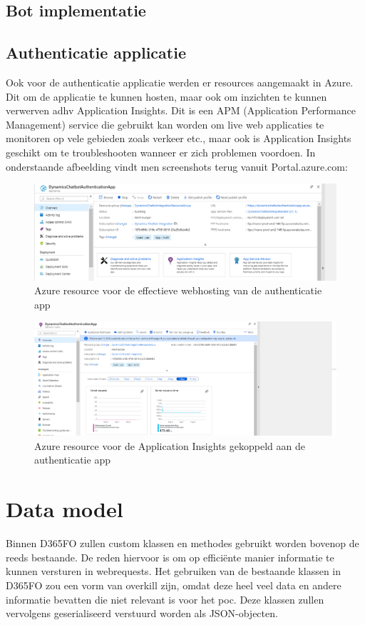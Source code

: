 \subsection{Bot implementatie}

\subsection{Authenticatie applicatie}
Ook voor de authenticatie applicatie werden er resources aangemaakt in Azure. Dit om de applicatie te kunnen hosten, maar ook om inzichten te kunnen verwerven adhv Application Insights. Dit is een APM (Application Performance Management) service die gebruikt kan worden om live web applicaties te monitoren op vele gebieden zoals verkeer etc., maar ook is Application Insights geschikt om te troubleshooten wanneer er zich problemen voordoen. In onderstaande afbeelding vindt men screenshots terug vanuit Portal.azure.com: 

\begin{figure}[H]
    \centering
         \includegraphics*[width=1\textwidth]{img/ResourceAuthentication1.png}
        \caption{Azure resource voor de effectieve webhosting van de authenticatie app}
    \end{figure}
    \begin{figure}[H]
        \includegraphics*[width=1\textwidth]{img/ResourceAuthentication2.png}
        \caption{Azure resource voor de Application Insights gekoppeld aan de authenticatie app}
\end{figure}  

\section{Data model}
Binnen D365FO zullen custom klassen en methodes gebruikt worden bovenop de reeds bestaande. De reden hiervoor is om op efficiënte manier informatie te kunnen versturen in webrequests. Het gebruiken van de bestaande klassen in D365FO zou een vorm van overkill zijn, omdat deze heel veel data en andere informatie bevatten die niet relevant is voor het poc. Deze klassen zullen vervolgens geserialiseerd verstuurd worden als JSON-objecten. 

